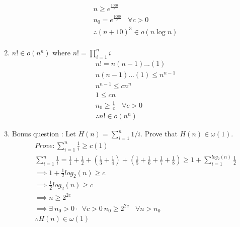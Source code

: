 \documentclass[12pt]{article}
\begin{document}
\begin{enumerate}
\begin{align*}
    &n \geq e^{\frac{1000}{c}}\\
    &n_{0} = e^{\frac{1000}{c}}\text{   } \ \forall c > 0\\
    &\therefore (n+10)^3 \in o(n \log n)\\
  \end{align*}
\item $n ! \in o(n^{n})$ where $n ! = \prod_{i=1}^n i$\\
  \begin{align*}
    &n ! = n(n-1)...(1)\\
    &n(n-1)...(1) \leq n^{n-1}\\
    &n^{n-1} \leq cn^n\\
    &1 \leq cn\\
    &n_{0} \geq \frac{1}{c}\text{   } \ \forall c > 0\\
    &\therefore n ! \in o(n^{n})
  \end{align*}
\item Bonus question : Let $H(n) = \sum_{i=1}^n 1/i$.
  Prove that $H(n) \in \omega (1) $.\\
  \begin{align*}
    &Prove: \sum_{i=1}^{n}\frac{1}{i} \geq c(1)\\
    &\sum_{i=1}^{n}\frac{1}{i} = \frac{1}{1} + \frac{1}{2} + (\frac{1}{3} + \frac{1}{4}) + (\frac{1}{5} + \frac{1}{6} + \frac{1}{7} + \frac{1}{8}) \geq 1 + \sum_{i=1}^{log_2(n)}\frac{1}{2}\\
    &\implies 1 + \frac{1}{2}log_2(n) \geq c\\
    &\implies \frac{1}{2}log_2(n) \geq c\\
    &\implies n \geq 2^{2c}\\
    &\implies \exists \  n_0 > 0 \cdot \  \ \forall c > 0 \  n_{0} \geq 2^{2c} \text{   } \ \forall n > n_0\\
    &\therefore H(n) \in \omega (1)
  \end{align*}
\end{enumerate}
\end{document}
